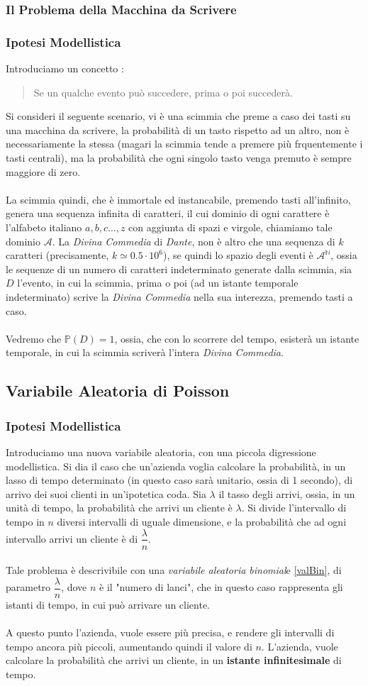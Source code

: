 \documentclass[12pt, letterpaper]{article}
\newcommand{\N}{{\mathbb N}}
\newcommand{\acc}{\\\hphantom{}\\}
\newcommand{\Prob}{{\mathbb P}}
\begin{document}
\subsubsection{Il Problema della Macchina da Scrivere}\subsubsection{Ipotesi Modellistica}
Introduciamo un concetto : \begin{quote}
    Se un qualche evento può succedere, prima o poi succederà.
\end{quote}
Si consideri il seguente scenario, vi è una scimmia che preme a caso dei tasti su una macchina da scrivere, 
la probabilità di un tasto rispetto ad un altro, non è necessariamente la stessa (magari la scimmia tende a premere 
più frquentemente i tasti centrali), ma la probabilità che ogni singolo tasto venga premuto è sempre 
maggiore di zero.\acc La scimmia quindi, che è immortale ed instancabile, premendo tasti all'infinito, genera 
una sequenza infinita di caratteri, il cui dominio di ogni carattere è l'alfabeto italiano \(a,b,c\dots,z\) con aggiunta 
di spazi e virgole, chiamiamo tale dominio \(\mathcal{A}\). La \textit{Divina Commedia} di \textit{Dante}, non è altro che una sequenza di 
\(k\) caratteri (precisamente, \(k\simeq 0.5\cdot10^6\)), se quindi lo spazio degli eventi 
è \(\mathcal{A}^{\N}\), ossia le sequenze di un numero di caratteri indeterminato generate dalla scimmia, sia \(D\) l'evento, in cui la scimmia, prima o poi (ad un istante 
temporale indeterminato) scrive la \textit{Divina Commedia} nella sua interezza, premendo tasti a caso.\acc 
Vedremo che \(\Prob(D)=1\), ossia, che con lo scorrere del tempo, esisterà un istante temporale, in cui 
la scimmia scriverà l'intera \textit{Divina Commedia}.
\subsection{Variabile Aleatoria di Poisson}
\subsubsection{Ipotesi Modellistica}
Introduciamo una nuova variabile aleatoria, con una piccola digressione modellistica. Si dia il caso 
che un'azienda voglia calcolare la probabilità, in un lasso di tempo determinato (in questo caso sarà unitario, ossia di 
1 secondo), di arrivo dei suoi clienti in un'ipotetica coda. Sia \(\lambda\) il tasso degli arrivi, 
ossia, in un unità di tempo, la probabilità che arrivi un cliente è \(\lambda\). Si divide l'intervallo di tempo 
in \(n\) diversi intervalli di uguale dimensione, e la probabilità che ad ogni intervallo 
arrivi un cliente è di \(\dfrac{\lambda}{n}\).\acc  Tale problema è descrivibile con una \textit{variabile 
aleatoria binomial}e \ref{valBin}, di parametro \(\dfrac{\lambda}{n}\), dove \(n\) è il "numero di lanci", che in 
questo caso rappresenta gli istanti di tempo, in cui può arrivare un cliente.\acc 
A questo punto l'azienda, vuole essere più precisa, e rendere gli intervalli di tempo ancora più piccoli, aumentando quindi 
il valore di \(n\). L'azienda, vuole calcolare la probabilità che arrivi un cliente, in un \textbf{istante infinitesimale} 
di tempo. 
\end{document}
